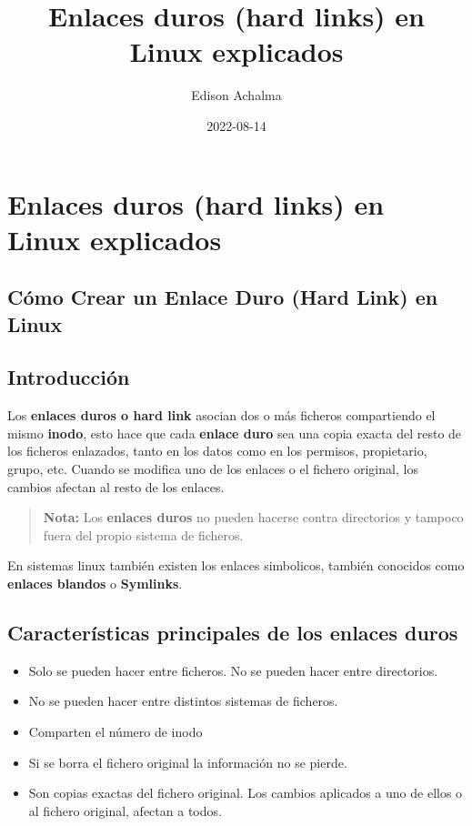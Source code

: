 \documentclass[
  jou,
  floatsintext,
  longtable,
  a4paper,
  nolmodern,
  notxfonts,
  notimes,
  12pt,
  colorlinks=true,linkcolor=blue,citecolor=blue,urlcolor=blue]{apa7}
\title{Enlaces duros (hard links) en Linux explicados}
\author{Edison Achalma}
\affiliation{
{Escuela Profesional de Economía, Universidad Nacional de San Cristóbal
de Huamanga}}
\date{2022-08-14}
\providecommand{\tightlist}{%
  \setlength{\itemsep}{0pt}\setlength{\parskip}{0pt}}
\begin{document}
\maketitle


\hypertarget{toc}{}
\tableofcontents
\newpage
\section[Introduction]{Enlaces duros (hard links) en Linux explicados}

\setcounter{secnumdepth}{3}

\setlength\LTleft{0pt}




\subsection{Cómo Crear un Enlace Duro (Hard Link) en
Linux}\label{cuxf3mo-crear-un-enlace-duro-hard-link-en-linux}

\subsection{Introducción}\label{introducciuxf3n}

Los \textbf{enlaces duros o hard link} asocian dos o más ficheros
compartiendo el mismo \textbf{inodo}, esto hace que cada \textbf{enlace
duro} sea una copia exacta del resto de los ficheros enlazados, tanto en
los datos como en los permisos, propietario, grupo, etc. Cuando se
modifica uno de los enlaces o el fichero original, los cambios afectan
al resto de los enlaces.

\begin{quote}
\textbf{Nota:} Los \textbf{enlaces duros} no pueden hacerse contra
directorios y tampoco fuera del propio sistema de ficheros.
\end{quote}

En sistemas linux también existen los enlaces simbolicos, también
conocidos como \textbf{enlaces blandos} o \textbf{Symlinks}.

\subsection{Características principales de los enlaces
duros}\label{caracteruxedsticas-principales-de-los-enlaces-duros}

\begin{itemize}
\tightlist
\item
  Solo se pueden hacer entre ficheros. No se pueden hacer entre
  directorios.
\item
  No se pueden hacer entre distintos sistemas de ficheros.
\item
  Comparten el número de inodo
\item
  Si se borra el fichero original la información no se pierde.
\item
  Son copias exactas del fichero original. Los cambios aplicados a uno
  de ellos o al fichero original, afectan a todos.
\end{itemize}
\end{document}
